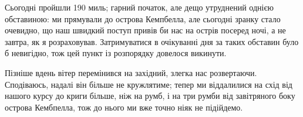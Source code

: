 Сьогодні пройшли 190 миль; гарний початок, але дещо утруднений однією
обставиною: ми прямували до острова Кемпбелла, але сьогодні зранку стало
очевидно, що наш швидкий поступ привів би нас на острів посеред ночі, а не
завтра, як я розраховував. Затримуватися в очікуванні дня за таких обставин
було б невигідно, тож цей пункт із розпорядку довелося викинути.

Пізніше вдень вітер перемінився на західний, злегка нас розвертаючи.
Сподіваюсь, надалі він більше не кружлятиме; тепер ми віддалилися на схід від
нашого курсу до криги більше, ніж на румб, і на три румби від завітряного боку
острова Кембпелла, тож до нього ми вже точно ніяк не підійдемо.
